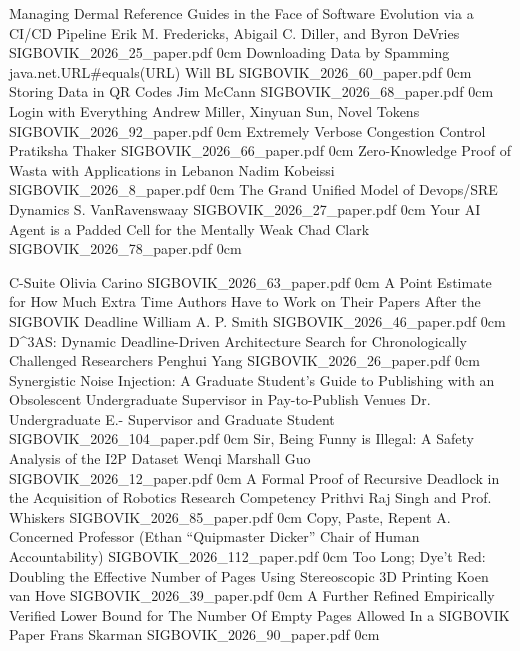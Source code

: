 \addpaper
	{Managing Dermal Reference Guides in the Face of Software Evolution via a CI/CD Pipeline}
	{Erik M. Fredericks, Abigail C. Diller, and Byron DeVries}
	{}
	{SIGBOVIK_2026_25_paper.pdf}
	{0cm}
	{}
\addpaper
	{Downloading Data by Spamming java.net.URL\#equals(URL)}
	{Will BL}
	{}
	{SIGBOVIK_2026_60_paper.pdf}
	{0cm}
	{}
\addpaper
	{Storing Data in QR Codes}
	{Jim McCann}
	{}
	{SIGBOVIK_2026_68_paper.pdf}
	{0cm}
	{}
\addpaper
	{Login with Everything}
	{Andrew Miller, Xinyuan Sun, Novel Tokens}
	{}
	{SIGBOVIK_2026_92_paper.pdf}
	{0cm}
	{}
\addpaper
	{Extremely Verbose Congestion Control}
	{Pratiksha Thaker}
	{}
	{SIGBOVIK_2026_66_paper.pdf}
	{0cm}
	{}
\addpaper
	{Zero-Knowledge Proof of Wasta with Applications in Lebanon}
	{Nadim Kobeissi}
	{}
	{SIGBOVIK_2026_8_paper.pdf}
	{0cm}
	{}
\addpaper
	{The Grand Unified Model of Devops/SRE Dynamics}
	{S. VanRavenswaay}
	{}
	{SIGBOVIK_2026_27_paper.pdf}
	{0cm}
	{}
\addpaper
	{Your AI Agent is a Padded Cell for the Mentally Weak}
	{Chad Clark}
	{}
	{SIGBOVIK_2026_78_paper.pdf}
	{0cm}
	{}

\addpaper
	{C-Suite}
	{Olivia Carino}
	{}
	{SIGBOVIK_2026_63_paper.pdf}
	{0cm}
	{}
\addpaper
	{A Point Estimate for How Much Extra Time Authors Have to Work on Their Papers After the SIGBOVIK Deadline}
	{William A. P. Smith}
	{}
	{SIGBOVIK_2026_46_paper.pdf}
	{0cm}
	{}
\addpaper
	{D^{3}AS: Dynamic Deadline-Driven Architecture Search for Chronologically Challenged Researchers}
	{Penghui Yang}
	{}
	{SIGBOVIK_2026_26_paper.pdf}
	{0cm}
	{}
\addpaper
	{Synergistic Noise Injection: A Graduate Student's Guide to Publishing with an Obsolescent Undergraduate Supervisor in Pay-to-Publish Venues}
	{Dr. Undergraduate E.- Supervisor and Graduate Student}
	{}
	{SIGBOVIK_2026_104_paper.pdf}
	{0cm}
	{}
\addpaper
	{Sir, Being Funny is Illegal: A Safety Analysis of the I2P Dataset}
	{Wenqi Marshall Guo}
	{}
	{SIGBOVIK_2026_12_paper.pdf}
	{0cm}
	{}
\addpaper
	{A Formal Proof of Recursive Deadlock in the Acquisition of Robotics Research Competency}
	{Prithvi Raj Singh and Prof. Whiskers}
	{}
	{SIGBOVIK_2026_85_paper.pdf}
	{0cm}
	{}
\addpaper
	{Copy, Paste, Repent}
	{A. Concerned Professor (Ethan “Quipmaster Dicker” Chair of Human Accountability)}
	{}
	{SIGBOVIK_2026_112_paper.pdf}
	{0cm}
	{}
\addpaper
	{Too Long; Dye't Red: Doubling the Effective Number of Pages Using Stereoscopic 3D Printing}
	{Koen van Hove}
	{}
	{SIGBOVIK_2026_39_paper.pdf}
	{0cm}
	{}
\addpaper
	{A Further Refined Empirically Verified Lower Bound for The Number Of Empty Pages Allowed In a SIGBOVIK Paper}
	{Frans Skarman}
	{}
	{SIGBOVIK_2026_90_paper.pdf}
	{0cm}
	{}

